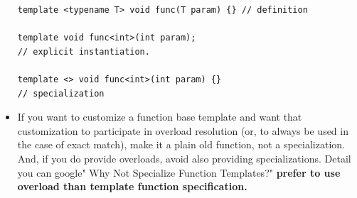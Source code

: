 \documentclass[a4paper,11pt,twoside]{book}
\begin{document}
\begin{itemize}
\begin{lstlisting}[numbers=none]
template <typename T> void func(T param) {} // definition

template void func<int>(int param); 
// explicit instantiation.

template <> void func<int>(int param) {} 
// specialization
\end{lstlisting}

	\item  If you want to customize a function base template and want that customization to participate in overload resolution (or, to always be used in the case of exact match), make it a plain old function, not a specialization. And, if you do provide overloads, avoid also providing specializations. Detail you can google" Why Not Specialize Function Templates?" \textbf{prefer to use overload than template function specification.}

\end{itemize}
\end{document}
